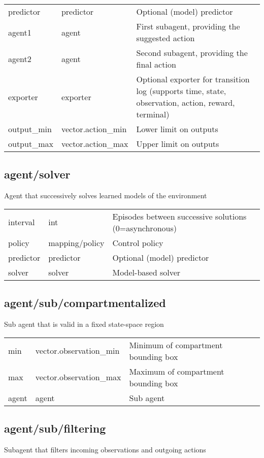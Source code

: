 \noindent\begin{tabular}{@{}lll@{}}
predictor&predictor&Optional (model) predictor\\
agent1&agent&First subagent, providing the suggested action\\
agent2&agent&Second subagent, providing the final action\\
exporter&exporter&Optional exporter for transition log (supports time, state, observation, action, reward, terminal)\\
output\_min&vector.action\_min&Lower limit on outputs\\
output\_max&vector.action\_max&Upper limit on outputs\\
\end{tabular}
\subsection{agent/solver}
\noindent Agent that successively solves learned models of the environment\\

\noindent\begin{tabular}{@{}lll@{}}
interval&int&Episodes between successive solutions (0=asynchronous)\\
policy&mapping/policy&Control policy\\
predictor&predictor&Optional (model) predictor\\
solver&solver&Model-based solver\\
\end{tabular}
\subsection{agent/sub/compartmentalized}
\noindent Sub agent that is valid in a fixed state-space region\\

\noindent\begin{tabular}{@{}lll@{}}
min&vector.observation\_min&Minimum of compartment bounding box\\
max&vector.observation\_max&Maximum of compartment bounding box\\
agent&agent&Sub agent\\
\end{tabular}
\subsection{agent/sub/filtering}
\noindent Subagent that filters incoming observations and outgoing actions\\

